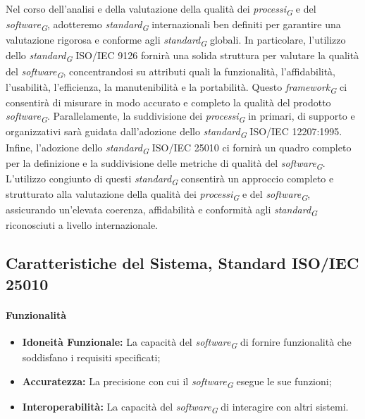 Nel corso dell'analisi e della valutazione della qualità dei \textit{processi}\textsubscript{\textit{G}} e del \textit{software}\textsubscript{\textit{G}}, adotteremo \textit{standard}\textsubscript{\textit{G}} internazionali ben definiti per garantire una valutazione rigorosa e conforme agli \textit{standard}\textsubscript{\textit{G}} globali. In particolare, l'utilizzo dello \textit{standard}\textsubscript{\textit{G}} ISO/IEC 9126 fornirà una solida struttura per valutare la qualità del \textit{software}\textsubscript{\textit{G}}, concentrandosi su attributi quali la funzionalità, l'affidabilità, l'usabilità, l'efficienza, la manutenibilità e la portabilità. Questo \textit{framework}\textsubscript{\textit{G}} ci consentirà di misurare in modo accurato e completo la qualità del prodotto \textit{software}\textsubscript{\textit{G}}. Parallelamente, la suddivisione dei \textit{processi}\textsubscript{\textit{G}} in primari, di supporto e organizzativi sarà guidata dall'adozione dello \textit{standard}\textsubscript{\textit{G}} ISO/IEC 12207:1995. Infine, l'adozione dello \textit{standard}\textsubscript{\textit{G}} ISO/IEC 25010 ci fornirà un quadro completo per la definizione e la suddivisione delle metriche di qualità del \textit{software}\textsubscript{\textit{G}}.
L'utilizzo congiunto di questi \textit{standard}\textsubscript{\textit{G}} consentirà un approccio completo e strutturato alla valutazione della qualità dei \textit{processi}\textsubscript{\textit{G}} e del \textit{software}\textsubscript{\textit{G}}, assicurando un'elevata coerenza, affidabilità e conformità agli \textit{standard}\textsubscript{\textit{G}} riconosciuti a livello internazionale.

\subsection{Caratteristiche del Sistema, Standard ISO/IEC 25010}

\paragraph{Funzionalità}
\begin{itemize}
    \item \textbf{Idoneità Funzionale:} La capacità del \textit{software}\textsubscript{\textit{G}} di fornire funzionalità che soddisfano i requisiti specificati;
    \item \textbf{Accuratezza:} La precisione con cui il \textit{software}\textsubscript{\textit{G}} esegue le sue funzioni;
    \item \textbf{Interoperabilità:} La capacità del \textit{software}\textsubscript{\textit{G}} di interagire con altri sistemi.
\end{itemize}

